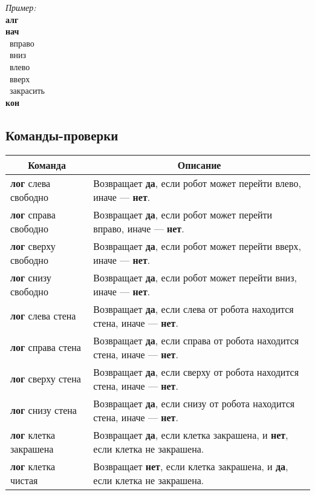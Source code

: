 \documentclass[12pt,a4paper]{article}
\newcommand{\otstup}{\textperiodcentered\ }
\begin{document}
\emph{Пример:}\\
{\sffamily
\textbf{алг}\\
\textbf{нач}\\
\otstup вправо\\
\otstup вниз\\
\otstup влево\\
\otstup вверх\\
\otstup закрасить\\
\textbf{кон}
}

\subsection{Команды-проверки}

\begin{center}
\begin{tabular}{||p{4.2cm}|p{11.8cm}||}
\hline
\hline
\multicolumn{1}{||c|}{\bfseries Команда} & \multicolumn{1}{|c||}{\bfseries Описание}\\
\hline
	\textbf{лог} слева свободно &
	Возвращает \textbf{да}, если робот может перейти влево, иначе --- \textbf{нет}.\\
	
	\textbf{лог} справа свободно &
	Возвращает \textbf{да}, если робот может перейти вправо, иначе --- \textbf{нет}. \\
	
	\textbf{лог} сверху свободно &
	Возвращает \textbf{да}, если робот может перейти вверх, иначе --- \textbf{нет}. \\
	
	\textbf{лог} снизу свободно &
	Возвращает \textbf{да}, если робот может перейти вниз, иначе --- \textbf{нет}. \\

	\textbf{лог} слева стена &
	Возвращает \textbf{да}, если слева от робота находится стена, иначе --- \textbf{нет}. \\
	
	\textbf{лог} справа стена &
	Возвращает \textbf{да}, если справа от робота находится стена, иначе --- \textbf{нет}. \\
	
	\textbf{лог} сверху стена &
	Возвращает \textbf{да}, если сверху от робота находится стена, иначе --- \textbf{нет}. \\
	
	\textbf{лог} снизу стена &
	Возвращает \textbf{да}, если снизу от робота находится стена, иначе --- \textbf{нет}. \\

	\textbf{лог} клетка закрашена &
	Возвращает \textbf{да}, если клетка закрашена, и \textbf{нет}, если клетка не закрашена. \\

	\textbf{лог} клетка чистая &
	Возвращает \textbf{нет}, если клетка закрашена, и \textbf{да}, если клетка не закрашена. \\
\hline
\hline
\end{tabular}
\end{center}
\end{document}
